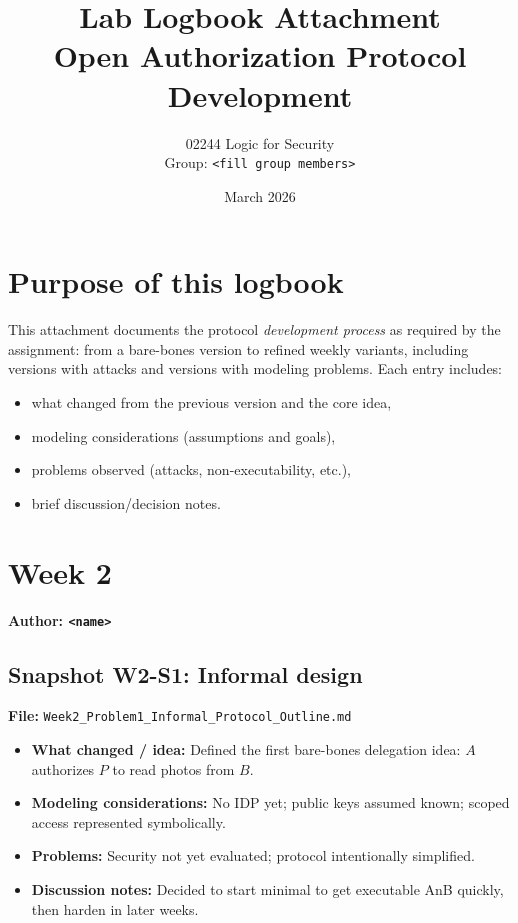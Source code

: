 \documentclass[11pt,a4paper]{article}
\title{Lab Logbook Attachment\\Open Authorization Protocol Development}
\author{02244 Logic for Security\\Group: \texttt{<fill group members>}}
\date{March 2026}
\begin{document}
\maketitle

\section*{Purpose of this logbook}
This attachment documents the protocol \emph{development process} as required by the assignment:
from a bare-bones version to refined weekly variants, including versions with attacks and versions
with modeling problems. Each entry includes:
\begin{itemize}[leftmargin=1.2em]
  \item what changed from the previous version and the core idea,
  \item modeling considerations (assumptions and goals),
  \item problems observed (attacks, non-executability, etc.),
  \item brief discussion/decision notes.
\end{itemize}

\section{Week 2}
\textbf{Author: \texttt{<name>}}

\subsection*{Snapshot W2-S1: Informal design}
\textbf{File:} \texttt{Week2\_Problem1\_Informal\_Protocol\_Outline.md}
\begin{itemize}[leftmargin=1.2em]
  \item \textbf{What changed / idea:} Defined the first bare-bones delegation idea: $A$ authorizes $P$ to read photos from $B$.
  \item \textbf{Modeling considerations:} No IDP yet; public keys assumed known; scoped access represented symbolically.
  \item \textbf{Problems:} Security not yet evaluated; protocol intentionally simplified.
  \item \textbf{Discussion notes:} Decided to start minimal to get executable AnB quickly, then harden in later weeks.
\end{itemize}
\end{document}
